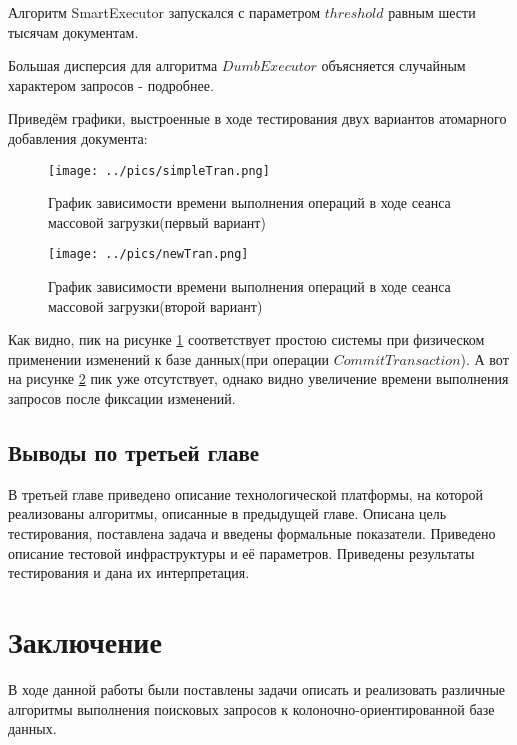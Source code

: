 \documentclass{matmex-diploma}
\begin{document}
        Алгоритм SmartExecutor запускался с параметром $threshold$ равным шести тысячам документам.
        
        Большая дисперсия для алгоритма $DumbExecutor$ объясняется случайным характером запросов - подробнее. 
        
        Приведём графики, выстроенные в ходе тестирования двух вариантов атомарного добавления документа:
        
        \begin{figure}[H]
            \centering
            \texttt{[image: ../pics/simpleTran.png]}
            \caption{График зависимости времени выполнения операций в ходе сеанса массовой загрузки(первый вариант)}
            \label{simpleTran}
        \end{figure}
        
        \begin{figure}[H]
            \centering
            \texttt{[image: ../pics/newTran.png]}
            \caption{График зависимости времени выполнения операций в ходе сеанса массовой загрузки(второй вариант)}
            \label{newTran}
        \end{figure}
        
        Как видно, пик на рисунке \ref{simpleTran} соответствует простою системы при физическом применении изменений к базе данных(при операции $CommitTransaction$). А вот на рисунке \ref{newTran} пик уже отсутствует, однако видно увеличение времени выполнения запросов после фиксации изменений.
        
        \subsection{Выводы по третьей главе}
            В третьей главе приведено описание технологической платформы, на которой реализованы алгоритмы, описанные в предыдущей главе. Описана цель тестирования, поставлена задача и введены формальные показатели. Приведено описание тестовой инфраструктуры и её параметров. Приведены результаты тестирования и дана их интерпретация. 
    
\section*{Заключение}
    В ходе данной работы были поставлены задачи описать и реализовать различные алгоритмы выполнения поисковых запросов к колоночно-ориентированной базе данных. %
    
\end{document}
